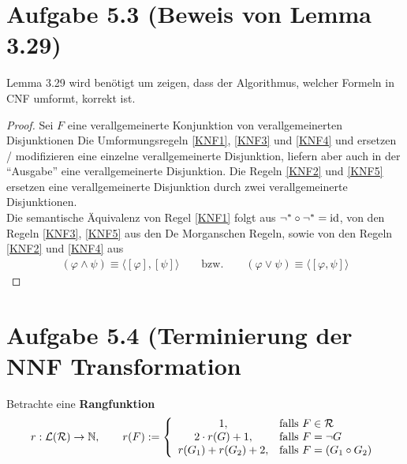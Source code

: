 \documentclass[12pt,a4paper]{article}
\newcommand{\RR}{\mathcal{R}}
\renewcommand{\L}{\mathcal{L}}
\begin{document}
\section*{Aufgabe 5.3 (Beweis von Lemma 3.29)}
Lemma 3.29 wird benötigt um zeigen, dass der Algorithmus, welcher Formeln in CNF umformt, korrekt ist.
\begin{proof}
Sei $F$ eine verallgemeinerte Konjunktion von verallgemeinerten Disjunktionen
Die Umformungsregeln \eqref{KNF1}, \eqref{KNF3} und \eqref{KNF4} und ersetzen / modifizieren eine einzelne verallgemeinerte Disjunktion, liefern aber auch in der ``Ausgabe'' eine verallgemeinerte Disjunktion. Die Regeln \eqref{KNF2} und \eqref{KNF5} ersetzen eine verallgemeinerte Disjunktion durch zwei verallgemeinerte Disjunktionen.\\
Die semantische Äquivalenz von Regel \eqref{KNF1} folgt aus $\neg^\ast\circ\neg^\ast=\text{id}$, von den Regeln \eqref{KNF3}, \eqref{KNF5} aus den De Morganschen  Regeln, sowie von den Regeln \eqref{KNF2} und \eqref{KNF4} aus 
\begin{align*}
(\varphi\wedge\psi)\equiv\big\langle[\varphi],[\psi]\big\rangle
\qquad\text{bzw.}\qquad
(\varphi\vee\psi)\equiv\big\langle[\varphi,\psi]\big\rangle
\end{align*}
\end{proof}

\section*{Aufgabe 5.4 (Terminierung der NNF Transformation}
Betrachte eine \textbf{Rangfunktion}
\begin{align*}
r:\L(\RR)\to\N,\qquad r(F):=\left\lbrace\begin{array}{cl}
1, &\falls F\in\RR\\
2\cdot r(G)+1, &\falls F=\neg G\\
r(G_1)+r(G_2)+2, &\falls F=(G_1\circ G_2)
\end{array}\right.
\end{align*}
\end{document}
